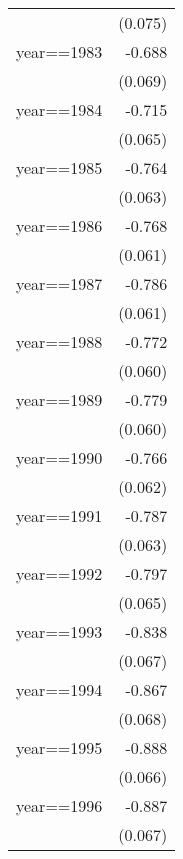 \begin{table}[htbp]
\begin{tabular}{l*{1}{D{.}{.}{-1}}}
                    &     (0.075)         \\
\addlinespace
year==1983          &      -0.688\sym{***}\\
                    &     (0.069)         \\
\addlinespace
year==1984          &      -0.715\sym{***}\\
                    &     (0.065)         \\
\addlinespace
year==1985          &      -0.764\sym{***}\\
                    &     (0.063)         \\
\addlinespace
year==1986          &      -0.768\sym{***}\\
                    &     (0.061)         \\
\addlinespace
year==1987          &      -0.786\sym{***}\\
                    &     (0.061)         \\
\addlinespace
year==1988          &      -0.772\sym{***}\\
                    &     (0.060)         \\
\addlinespace
year==1989          &      -0.779\sym{***}\\
                    &     (0.060)         \\
\addlinespace
year==1990          &      -0.766\sym{***}\\
                    &     (0.062)         \\
\addlinespace
year==1991          &      -0.787\sym{***}\\
                    &     (0.063)         \\
\addlinespace
year==1992          &      -0.797\sym{***}\\
                    &     (0.065)         \\
\addlinespace
year==1993          &      -0.838\sym{***}\\
                    &     (0.067)         \\
\addlinespace
year==1994          &      -0.867\sym{***}\\
                    &     (0.068)         \\
\addlinespace
year==1995          &      -0.888\sym{***}\\
                    &     (0.066)         \\
\addlinespace
year==1996          &      -0.887\sym{***}\\
                    &     (0.067)         \\

\end{tabular}
\end{table}
